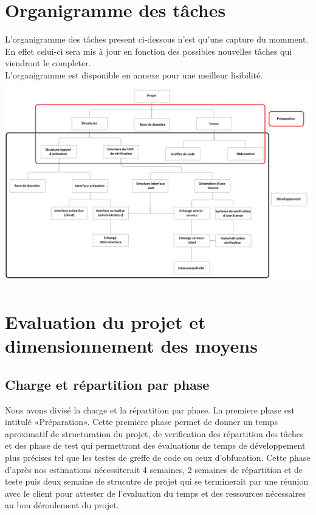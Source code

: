 \chapter{Organigramme des tâches}
L'organigramme des tâches present ci-dessous n'est qu'une capture du momment. En effet celui-ci sera mis à jour en fonction 
des possibles nouvelles tâches qui viendront le completer. \\

L'organigramme est disponible en annexe pour une meilleur lisibilité.\\ \newline
\includegraphics[width=18cm]{organi.png}

\chapter{Evaluation du projet et dimensionnement des moyens}
\section{Charge et répartition par phase}
Nous avons divisé la charge et la répartition par phase. La premiere phase est intitulé «Préparation». Cette premiere phase permet
de donner un temps aproximatif de structuration du projet, de verification des répartition des tâches et des phase de test qui permettront des évaluations de temps de
développement plus précises tel que les testes de greffe de code ou ceux d'obfucation. Cette phase d'après nos estimations nécessiterait 4 semaines, 2 semaines de 
répartition et de teste puis deux semaine de strucutre de projet qui se terminerait par une réunion avec le client pour attester de l'evaluation du temps
et des ressources nécessaires au bon déroulement du projet.
\\ \newline

